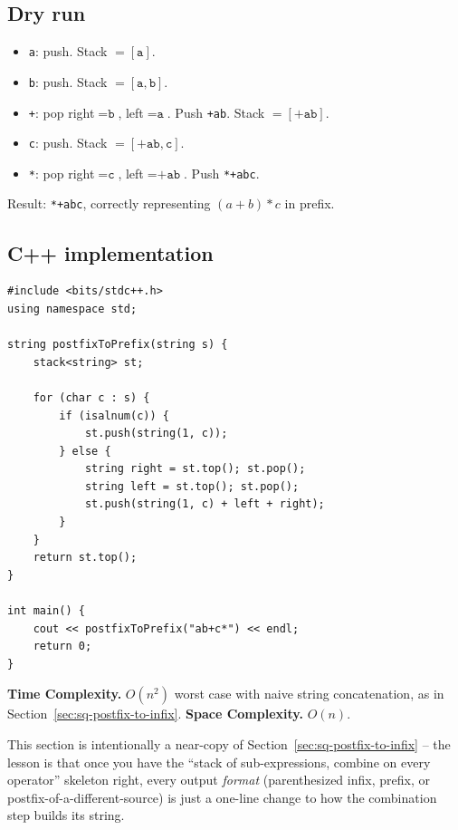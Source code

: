 \subsection*{Dry run}


\begin{itemize}
  \item \texttt{a}: push. Stack $=[\texttt{a}]$.
  \item \texttt{b}: push. Stack $=[\texttt{a},\texttt{b}]$.
  \item \texttt{+}: pop right$=\texttt{b}$, left$=\texttt{a}$. Push
        \texttt{+ab}. Stack $=[\texttt{+ab}]$.
  \item \texttt{c}: push. Stack $=[\texttt{+ab},\texttt{c}]$.
  \item \texttt{*}: pop right$=\texttt{c}$, left$=\texttt{+ab}$. Push
        \texttt{*+abc}.
\end{itemize}

Result: \texttt{*+abc}, correctly representing $(a+b)*c$ in prefix.

\subsection*{C++ implementation}

\begin{lstlisting}
#include <bits/stdc++.h>
using namespace std;

string postfixToPrefix(string s) {
    stack<string> st;

    for (char c : s) {
        if (isalnum(c)) {
            st.push(string(1, c));
        } else {
            string right = st.top(); st.pop();
            string left = st.top(); st.pop();
            st.push(string(1, c) + left + right);
        }
    }
    return st.top();
}

int main() {
    cout << postfixToPrefix("ab+c*") << endl;
    return 0;
}
\end{lstlisting}

\begin{complexitybox}
\textbf{Time Complexity.} $O(n^2)$ worst case with naive string
concatenation, as in Section~\ref{sec:sq-postfix-to-infix}.
\textbf{Space Complexity.} $O(n)$.
\end{complexitybox}

\begin{takeawaybox}
This section is intentionally a near-copy of
Section~\ref{sec:sq-postfix-to-infix} -- the lesson is that once you have
the ``stack of sub-expressions, combine on every operator'' skeleton
right, every output \emph{format} (parenthesized infix, prefix, or
postfix-of-a-different-source) is just a one-line change to how the
combination step builds its string.
\end{takeawaybox}
